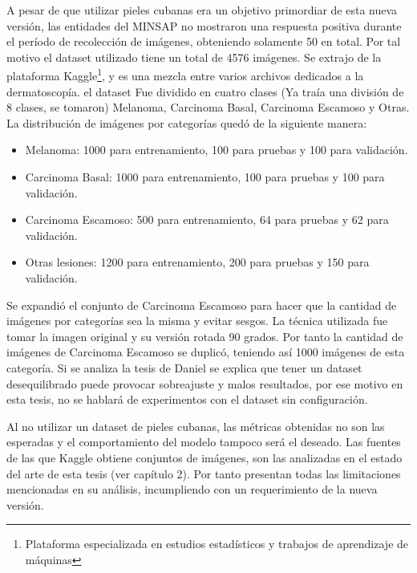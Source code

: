 A pesar de que utilizar pieles cubanas era un objetivo primordiar de esta nueva versi\'on,
las entidades del MINSAP no mostraron una respuesta positiva durante el per\'iodo
de recolecci\'on de im\'agenes, obteniendo solamente 50 en total. Por tal motivo
el dataset utilizado tiene un total de 4576 im\'agenes. Se extrajo de la plataforma
Kaggle\footnote{Plataforma especializada en estudios estad\'isticos y trabajos de aprendizaje de m\'aquinas},
y es una mezcla entre varios archivos dedicados a la dermatoscop\'ia. 
el dataset Fue dividido en cuatro clases (Ya tra\'ia una divisi\'on de 8 clases, se tomaron)
Melanoma, Carcinoma Basal, Carcinoma Escamoso y Otras. La distribuci\'on 
de im\'agenes por categor\'ias qued\'o de la siguiente manera:

\begin{itemize}
    \item Melanoma: 1000 para entrenamiento, 100 para pruebas y 100 para validaci\'on.
    \item Carcinoma Basal: 1000 para entrenamiento, 100 para pruebas y 100 para validaci\'on.
    \item Carcinoma Escamoso: 500 para entrenamiento, 64 para pruebas y 62 para validaci\'on.
    \item Otras lesiones: 1200 para entrenamiento, 200 para pruebas y 150 para validaci\'on.
\end{itemize}

Se expandi\'o el conjunto de Carcinoma Escamoso para hacer que la cantidad de im\'agenes por 
categor\'ias sea la misma y evitar sesgos. La t\'ecnica utilizada fue tomar la imagen original
y su versi\'on rotada 90 grados. Por tanto la cantidad de im\'agenes de Carcinoma Escamoso se 
duplic\'o, teniendo as\'i 1000 im\'agenes de esta categor\'ia. Si se analiza la tesis de Daniel\cite{tesisDaniel}
se explica que tener un dataset desequilibrado puede provocar sobreajuste y malos resultados, 
por ese motivo en esta tesis, no se hablar\'a de experimentos con el dataset sin configuraci\'on.

Al no utilizar un dataset de pieles cubanas, las m\'etricas obtenidas no son las esperadas y 
el comportamiento del modelo tampoco ser\'a el deseado. Las fuentes de las que Kaggle obtiene
conjuntos de im\'agenes, son las analizadas en el estado del arte de esta tesis (ver cap\'itulo 2).
Por tanto presentan todas las limitaciones mencionadas en su an\'alisis, incumpliendo con 
un requerimiento de la nueva versi\'on.

